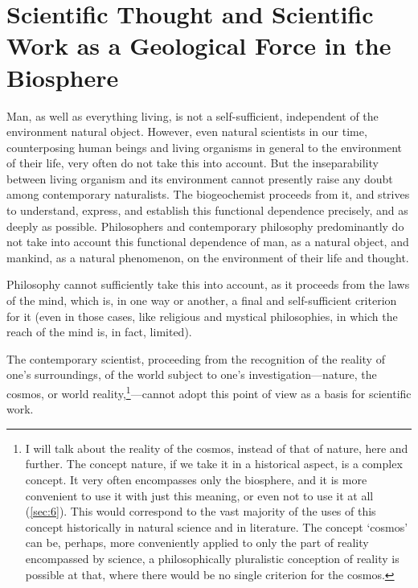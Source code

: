 \part{Scientific Thought and Scientific Work as a Geological Force in the
Biosphere}



\Section %
Man, as well as everything living, is not a self-sufficient, independent of the
environment natural object.  However, even natural scientists in our time,
counterposing human beings and living organisms in general to the environment
of their life, very often do not take this into account.  But the
inseparability between living organism and its environment cannot presently
raise any doubt among contemporary naturalists.  The biogeochemist proceeds
from it, and strives to understand, express, and establish this functional
dependence precisely, and as deeply as possible.  Philosophers and contemporary
philosophy predominantly do not take into account this functional dependence of
man, as a natural object, and mankind, as a natural phenomenon, on the
environment of their life and thought.

Philosophy cannot sufficiently take this into account, as it proceeds from the
laws of the mind, which is, in one way or another, a final and self-sufficient
criterion for it (even in those cases, like religious and mystical
philosophies, in which the reach of the mind is, in fact, limited).

The contemporary scientist, proceeding from the recognition of the reality of
one's surroundings, of the world subject to one's investigation---nature, the
cosmos, or world reality,\footnote{
	I will talk about the reality of the cosmos, instead of that of nature,
	here and further.  The concept nature, if we take it in a historical
	aspect, is a complex concept.  It very often encompasses only the
	biosphere, and it is more convenient to use it with just this meaning,
	or even not to use it at all (\autoref{sec:6}).  This would correspond
	to the vast majority of the uses of this concept historically in
	natural science and in literature.  The concept `cosmos' can be,
	perhaps, more conveniently applied to only the part of reality
	encompassed by science, a philosophically pluralistic conception of
	reality is possible at that, where there would be no single criterion
	for the cosmos.
}---cannot adopt this point of view as a basis for scientific work.


